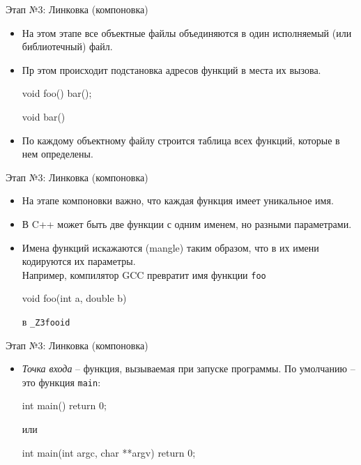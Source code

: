 \documentclass[9pt]{beamer}
\begin{document}
\begin{frame}[fragile]{Этап №3: Линковка (компоновка)}
    \begin{itemize}
        \item На этом этапе все объектные файлы объединяются в один исполняемый (или библиотечный) файл.
        \item Пр этом происходит подстановка адресов функций в места их вызова.
        \begin{cppcode}
            void foo()
            {
                bar();
            }
        \end{cppcode}
        
        \vspace{1em}
        \begin{cppcode}
            void bar() { }
        \end{cppcode}
        \item По каждому объектному файлу строится таблица всех функций, которые в нем определены.
    \end{itemize}
\end{frame}

\begin{frame}[fragile]{Этап №3: Линковка (компоновка)}
    \begin{itemize}
        \item На этапе компоновки важно, что каждая функция имеет уникальное имя.
        \item В C++ может быть две функции с одним именем, но разными параметрами. 
        \item Имена функций искажаются (mangle) таким образом, что в их имени кодируются их параметры.\\
        Например, компилятор GCC превратит имя функции \texttt{foo}
        
        \begin{cppcode}
            void foo(int a, double b) {}
        \end{cppcode}

    в \texttt{\_Z3fooid}
    \end{itemize}
\end{frame}


\begin{frame}[fragile]{Этап №3: Линковка (компоновка)}
    \begin{itemize}
        \item \emph{Точка входа} -- функция, вызываемая при запуске программы. По умолчанию -- это функция \texttt{main}:
        \begin{cppcode}
            int main()
            {
                return 0;
            }
        \end{cppcode}
        или
        \begin{cppcode}
            int main(int argc, char **argv)
            {
                return 0;
            }
        \end{cppcode}
    \end{itemize}
\end{frame}
\end{document}
